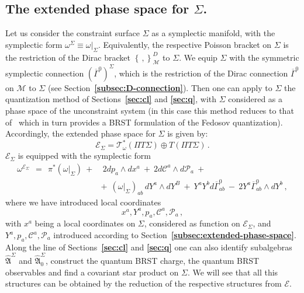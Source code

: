 \documentclass[a4paper,11pt]{amsart}
\numberwithin{thm}{section} %
\numberwithin{equation}{section} %
\numberwithin{figure}{section} %
\newcommand{\bref}[1]{{\bf \ref{#1}}}
\newcommand{\pb}[2]{\left\{{}#1{},{}#2{}\right\}}
\renewcommand{\:}{{\rm\, :\,}}
\def\bar{\overline}
\def\cP{{\mathcal P}}
\def\cc{{\mathcal C}}
\def\mod{{\mathcal T}^*_\omega}
\def\manM{{\mathcal M}}
\def\qA{{\hat{\mathfrak A}}}
\def\E{{ \mathcal E}}
\def\con{{\bar\Gamma}}
\begin{document}
\subsection{The extended phase space for $\Sigma$.}
Let us consider the constraint surface $\Sigma$ as
a symplectic manifold, with the symplectic form $\omega^\Sigma
\equiv \omega\bigr|_\Sigma$. Equivalently, the respective Poisson bracket
on $\Sigma$ is the restriction of the Dirac bracket $\pb{\,}{}^D_\manM$ to
$\Sigma$.  We equip $\Sigma$ with the symmetric symplectic connection
$(\con^0)^\Sigma$, which is the restriction of the Dirac connection
$\con^0$ on $\manM$ to $\Sigma$ (see
Section~\bref{subsec:D-connection}).  Then one can apply
to $\Sigma$ the quantization method of Sections~\bref{sec:cl} and
\bref{sec:q}, with $\Sigma$ considered as a phase space of the
unconstraint system (in this case this method reduces
to that of~\cite{[GL]} which in turn provides
a BRST formulation of the Fedosov quantization).
Accordingly, the extended phase space
for $\Sigma$ is given by:
\begin{equation}
\E_\Sigma=\mod(\Pi T\Sigma)\oplus T(\Pi T\Sigma)\,.
\end{equation}
$\E_\Sigma$ is equipped with the symplectic form
\begin{equation}
\begin{split}
  \label{eq:symplectic-Sigma}
\omega^{\E_\Sigma}~~=~~\pi^*(\omega{\bigr|}_\Sigma)~+&~2dp_a\wedge dx^a~+~
2d\cc^a\wedge d\cP_a~+\\
&+~~(\omega{\bigr|}_\Sigma)_{ab}\,dY^a \wedge dY^B
~+~Y^aY^b d\con^0_{ab}
~-~2Y^a \con^0_{ab}\wedge dY^b\,,
\end{split}
\end{equation}
where we have introduced local coordinates
\begin{equation}
  \label{eq:coord-sigma}
  x^a,Y^a,p_a,\cc^a,\cP_a\,,
\end{equation}
with $x^a$ being a local coordinates on $\Sigma$,
considered as function on $\E_\Sigma$, and $Y^a,p_a,\cc^a,\cP_a$
introduced according to Section~\bref{subsec:extended-phase-space}.
Along the line of Sections~\bref{sec:cl} and \bref{sec:q} one can also
identify subalgebras $\qA^\Sigma$ and $\qA^\Sigma_0$,
construct the quantum BRST charge, the quantum BRST observables and find
a covariant star product on $\Sigma$.  We will see that
all this structures can be obtained by the reduction of the respective
structures from $\E$.
\end{document}
